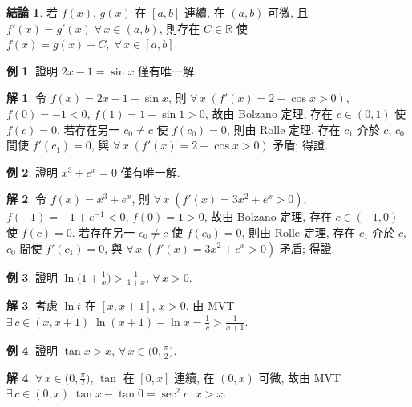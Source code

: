 \documentclass[12pt]{extarticle}
\newcommand{\ds}{\displaystyle}
\theoremstyle{definition}
\newtheorem*{fact}{結論}
\newtheorem*{ex}{例}
\newtheorem*{sol}{解}
\begin{document}
\begin{fact}
  若 $f(x)$, $g(x)$ 在 $[a, b]$ 連續, 在 $(a, b)$ 可微, 且 $f'(x) = g'(x)\;\forall\,x\in(a, b)$, 則存在 $C\in\mathbb{R}$ 使 $f(x) = g(x) + C,\;\forall\,x\in[a, b]$. 
\end{fact}

\begin{ex}
  證明 $\ds 2x - 1 = \sin x$ 僅有唯一解. 
\end{ex}

\begin{sol}
  令 $\ds f(x) = 2 x - 1 - \sin x$, 則 $\ds\forall\,x\;(f'(x) = 2 - \cos x > 0)$, $f(0) = -1 < 0$, $f(1) = 1 - \sin 1 > 0$, 故由 Bolzano 定理, 存在 $\ds c\in(0, 1)$ 使 $f(c) = 0$. 若存在另一 $c_0\ne c$ 使 $f(c_0) = 0$, 則由 Rolle 定理, 存在 $c_1$ 介於 $c$, $c_0$ 間使 $f'(c_1) = 0$, 與 $\ds\forall\,x\;(f'(x) = 2 - \cos x > 0)$ 矛盾; 得證. 
\end{sol}

\begin{ex}
  證明 $\ds x^3 + e^x = 0$ 僅有唯一解. 
\end{ex}

\begin{sol}
  令 $\ds f(x) = x^3 + e^x$, 則 $\ds\forall\,x\;(f'(x) = 3 x^2 + e^x > 0)$, $f(-1) = -1 + e^{-1} < 0$, $f(0) = 1 > 0$, 故由 Bolzano 定理, 存在 $\ds c\in(-1, 0)$ 使 $f(c) = 0$. 若存在另一 $c_0\ne c$ 使 $f(c_0) = 0$, 則由 Rolle 定理, 存在 $c_1$ 介於 $c$, $c_0$ 間使 $f'(c_1) = 0$, 與 $\ds\forall\,x\;(f'(x) = 3 x^2 + e^x > 0)$ 矛盾; 得證. 
\end{sol}

\begin{ex}
  證明 $\ds\ln\big(1 + \frac{1}{x}\big) > \frac{1}{1 + x}$, $\forall\,x > 0$. 
\end{ex}

\begin{sol}
  考慮 $\ds\ln t$ 在 $\ds[x, x + 1]$, $\ds x > 0$. 由 MVT $\ds\exists\,c\in(x, x + 1)\;\ln(x + 1) - \ln x = \frac{1}{c} > \frac{1}{x + 1}$. 
\end{sol}

\begin{ex}
  證明 $\ds\tan x > x$, $\ds\forall\,x\in\big(0, \frac{\pi}{2}\big)$. 
\end{ex}

\begin{sol}
  $\ds\forall\,x\in\big(0, \frac{\pi}{2}\big)$, $\ds\tan$ 在 $[0, x]$ 連續, 在 $(0, x)$ 可微, 故由 MVT $\ds\exists\,c\in(0, x)\;\tan x - \tan 0 = \sec^2 c\cdot x > x$. 
\end{sol}
\end{document}
